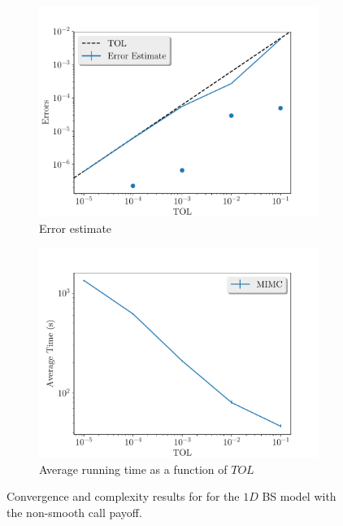\documentclass[11pt]{article}
\begin{document}
\begin{figure}[!h]
	\centering
	\begin{subfigure}{.5\textwidth}
		\centering
		\includegraphics[width=1\linewidth]{./figures/1D_BS_8_steps_non_smooth/error_estimate.pdf}
		\caption{Error estimate}
		\label{fig:misc_1D_BS_non_smooth_8steps_sub1}
	\end{subfigure}%
	\begin{subfigure}{.5\textwidth}
		\centering
		\includegraphics[width=1\linewidth]{./figures/1D_BS_8_steps_non_smooth/average_running_time.pdf}
		\caption{Average running time as a function of $TOL$}
		\label{fig:misc_1D_BS_non_smooth_8steps_sub2}
	\end{subfigure}%
	\caption{Convergence and complexity results for for the $1D$ BS model with the non-smooth call payoff.}
	\label{fig:misc_1D_BS_nonsmooth_8steps_2}
\end{figure}
\end{document}
